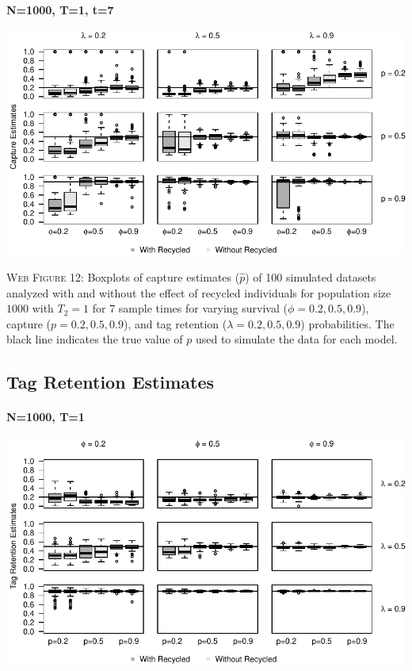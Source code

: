 \documentclass[]{article}
\let\oldparagraph\paragraph
\renewcommand{\paragraph}[1]{\oldparagraph{#1}\mbox{}}
\begin{document}
\paragraph{N=1000, T=1, t=7}\label{n1000-t1-t7-1}

\includegraphics{Appendix_BW_files/figure-latex/figure12_capture_GJSTL6-1.pdf}

\textsc{Web Figure 12:} Boxplots of capture estimates (\(\hat{p}\)) of
100 simulated datasets analyzed with and without the effect of recycled
individuals for population size \(1000\) with \(T_2=1\) for 7 sample times for varying survival (\(\phi=0.2,0.5,0.9\)), capture
(\(p=0.2,0.5,0.9\)), and tag retention (\(\lambda=0.2,0.5,0.9\))
probabilities. The black line indicates the true value of \(p\) used to
simulate the data for each model.

\newpage

\subsection{Tag Retention Estimates}\label{tag-retention-estimates}

\paragraph{N=1000, T=1}\label{n1000-t1-2}

\includegraphics{Appendix_BW_files/figure-latex/figure13_tagretention_GJSTL1-1.pdf}
\end{document}
